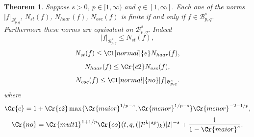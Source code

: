 \documentclass{amsart}
\newtheorem{theorem}{Theorem}[section]
\theoremstyle{definition}
\newcommand{\Cll}[2][normal]{\Cl[#1]{#2}}
\newcommand{\Crr}[1]{\Cr{#1}}
\begin{document}
 \begin{theorem} \label{alte} Suppose $s> 0$, $p\in [1,\infty)$ and $q\in [1,\infty]$. Each one of the norms  $|f|_{\mathcal{B}^s_{p,q}}$, $N_{st}(f)$, $N_{haar}(f)$, $N_{osc}(f)$ is finite if and only if  $f\in \mathcal{B}^s_{p,q}$. Furthermore these norms are equivalent on $\mathcal{B}^s_{p,q}$. Indeed
\begin{equation}\label{in1}  |f|_{\mathcal{B}^s_{p,q}}\leq N_{st}(f),\end{equation}
\begin{equation}\label{in2}N_{st}(f)\leq \Cll{e} N_{haar}(f),\end{equation} 
\begin{equation}\label{in3}N_{haar}(f)\leq \Crr{c2} N_{osc}(f),\end{equation}
\begin{equation}\label{in4}N_{osc}(f)\leq \Cll{no}  |f|_{\mathcal{B}^s_{p,q}}.\end{equation}
where
$$\Crr{e}=1+\Crr{c2} \max\{ \Crr{maior}^{1/p-s}, \Crr{menor}^{1/p-s}\}  \Crr{menor}^{-2-1/p},$$
 $$\Crr{no}=\Crr{mult1}^{1+1/p}  \Crr{co}(t,q, ( |\mathcal{P}^k|^{sp} )_k )|I|^{-s}+\frac{1}{1-\Crr{maior}^s}.$$
 \end{theorem}
\end{document}
